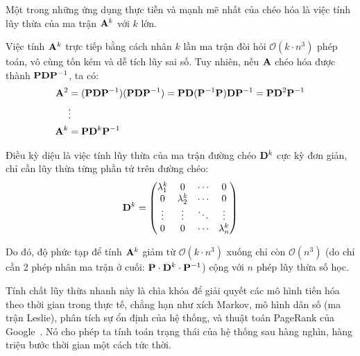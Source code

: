 Một trong những ứng dụng thực tiễn và mạnh mẽ nhất của chéo hóa là việc tính lũy thừa của ma trận $\mathbf{A}^k$ với $k$ lớn. 

Việc tính $\mathbf{A}^k$ trực tiếp bằng cách nhân $k$ lần ma trận đòi hỏi $\mathcal{O}(k \cdot n^3)$ phép toán, vô cùng tốn kém và dễ tích lũy sai số. Tuy nhiên, nếu $\mathbf{A}$ chéo hóa được thành $\mathbf{P}\mathbf{D}\mathbf{P}^{-1}$, ta có:
\begin{align*}
    \mathbf{A}^2 &= (\mathbf{P}\mathbf{D}\mathbf{P}^{-1})(\mathbf{P}\mathbf{D}\mathbf{P}^{-1}) = \mathbf{P}\mathbf{D}(\mathbf{P}^{-1}\mathbf{P})\mathbf{D}\mathbf{P}^{-1} = \mathbf{P}\mathbf{D}^2\mathbf{P}^{-1} \\
    &\vdots \\
    \mathbf{A}^k &= \mathbf{P}\mathbf{D}^k\mathbf{P}^{-1}
\end{align*}

Điều kỳ diệu là việc tính lũy thừa của ma trận đường chéo $\mathbf{D}^k$ cực kỳ đơn giản, chỉ cần lũy thừa từng phần tử trên đường chéo:
\begin{equation}
    \mathbf{D}^k = 
    \begin{pmatrix}
        \lambda_1^k & 0 & \cdots & 0 \\
        0 & \lambda_2^k & \cdots & 0 \\
        \vdots & \vdots & \ddots & \vdots \\
        0 & 0 & \cdots & \lambda_n^k
    \end{pmatrix}
\end{equation}

Do đó, độ phức tạp để tính $\mathbf{A}^k$ giảm từ $\mathcal{O}(k \cdot n^3)$ xuống chỉ còn $\mathcal{O}(n^3)$ (do chỉ cần 2 phép nhân ma trận ở cuối: $\mathbf{P} \cdot \mathbf{D}^k \cdot \mathbf{P}^{-1}$) cộng với $n$ phép lũy thừa số học.

\begin{note}
Tính chất lũy thừa nhanh này là chìa khóa để giải quyết các mô hình tiến hóa theo thời gian trong thực tế, chẳng hạn như xích Markov, mô hình dân số (ma trận Leslie), phân tích sự ổn định của hệ thống, và thuật toán PageRank của Google~\cite{strang2023}. Nó cho phép ta tính toán trạng thái của hệ thống sau hàng nghìn, hàng triệu bước thời gian một cách tức thời.
\end{note}
